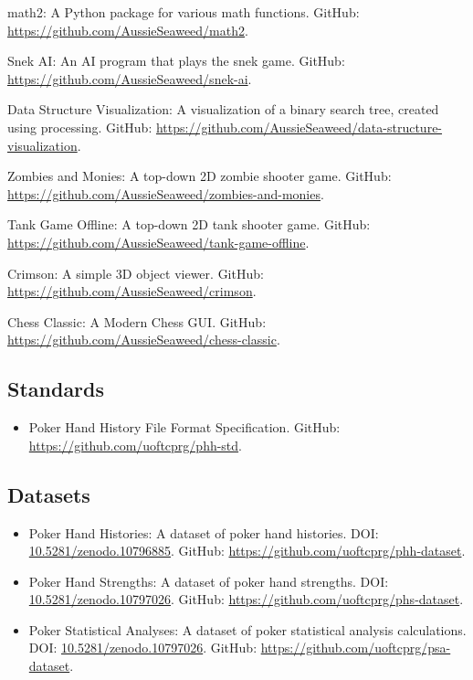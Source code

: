\documentclass{article}
\begin{document}
\begin{itemize}
{			\item math2: A Python package for various math functions. {\small GitHub: \url{https://github.com/AussieSeaweed/math2}.}
			\item Snek AI: An AI program that plays the snek game. {\small GitHub: \url{https://github.com/AussieSeaweed/snek-ai}.}
			\item Data Structure Visualization: A visualization of a binary search tree, created using processing. {\small GitHub: \url{https://github.com/AussieSeaweed/data-structure-visualization}.}
			\item Zombies and Monies: A top-down 2D zombie shooter game. {\small GitHub: \url{https://github.com/AussieSeaweed/zombies-and-monies}.}
			\item Tank Game Offline: A top-down 2D tank shooter game. {\small GitHub: \url{https://github.com/AussieSeaweed/tank-game-offline}.}
			\item Crimson: A simple 3D object viewer. {\small GitHub: \url{https://github.com/AussieSeaweed/crimson}.}
			\item Chess Classic: A Modern Chess GUI. {\small GitHub: \url{https://github.com/AussieSeaweed/chess-classic}.}
		}{}
	\end{itemize}

	\subsection*{Standards}

	\begin{itemize}
		\item Poker Hand History File Format Specification. {\small GitHub: \url{https://github.com/uoftcprg/phh-std}.}
	\end{itemize}

	\subsection*{Datasets}

	\begin{itemize}
		\item Poker Hand Histories: A dataset of poker hand histories. {\small DOI: \href{https://doi.org/10.5281/zenodo.10796885}{10.5281/zenodo.10796885}. GitHub: \url{https://github.com/uoftcprg/phh-dataset}.}
		\item Poker Hand Strengths: A dataset of poker hand strengths. {\small DOI: \href{https://doi.org/10.5281/zenodo.10797026}{10.5281/zenodo.10797026}. GitHub: \url{https://github.com/uoftcprg/phs-dataset}.}
  		\item Poker Statistical Analyses: A dataset of poker statistical analysis calculations. {\small DOI: \href{https://doi.org/10.5281/zenodo.10797026}{10.5281/zenodo.10797026}. GitHub: \url{https://github.com/uoftcprg/psa-dataset}.}
	\end{itemize}
\end{document}
